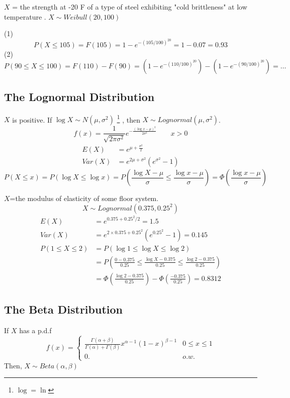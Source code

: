\begin{exmp}
$X$ = the strength at  -20 F of a type of steel exhibiting "cold brittleness" at low temperature . $X \sim Weibull(20,100)$

(1) 
\[P(X \leq 105)=F(105)=1-e^{-(105/100)^{20}}=1-0.07=\boxed{0.93}\]
(2)
\[P(90 \leq X \leq 100)=F(110)-F(90)=\left(1-e^{-(110/100)^{20}}\right)-\left(1-e^{-(90/100)^{20}}\right)=\boxed{\dots}\] 
\end{exmp}

\subsection{The Lognormal Distribution}
$X$ is positive. If $\log{X} \sim N(\mu,\sigma^2)$ \footnote{$\log=\ln$} , then $X \sim Lognormal(\mu,\sigma^2)$.
\[f(x)=\frac{1}{\sqrt{2 \pi \sigma^2}} e^{-\frac{(\log{x}-\mu)^2}{2 \sigma^2}}   \qquad  x>0\]
\begin{align*}
E(X)&=e^{\mu +\frac{\sigma^2}{2}} \\
Var(X)&=e^{2\mu +\sigma^2} (e^{\sigma^2}-1)
\end{align*}
\[P(X \leq x)=P(\log{X}\leq \log{x})= P \left(\frac{\log{X}-\mu}{\sigma} \leq \frac{\log{x}-\mu}{\sigma} \right)  =\Phi \left(\frac{\log{x}-\mu}{\sigma} \right)\]

\begin{exmp}
$X$=the modulus of elasticity of some floor system.
\[X \sim Lognormal(0.375,0.25^2)\]
\begin{align*}
E(X)&=e^{0.375+0.25^{2}/2}=1.5\\
Var(X)&= e^{2\times0.375+0.25^{2}}\left(e^{0.25^{2}}-1\right)=0.145\\
P(1 \leq X \leq 2)&=P(\log{1} \leq \log{X}\leq \log{2})\\
&= P \left(\frac{0-0.375}{0.25} \leq \frac{\log{X}-0.375}{0.25} \leq \frac{\log{2}-0.375}{0.25} \right) \\
& =\Phi \left(\frac{\log{2}-0.375}{0.25} \right)-\Phi \left(\frac{-0.375}{0.25} \right)=\boxed{0.8312}
\end{align*}


\end{exmp}

\subsection{The Beta Distribution}
If $X$ has a p.d.f 
\[f(x)=\begin{cases}
\frac{\Gamma(\alpha+\beta)}{\Gamma(\alpha)+\Gamma(\beta)}x^{\alpha-1}(1-x)^{\beta-1}  & 0 \leq x \leq 1 \\
0. & o.w.
\end{cases}\]
Then, $X \sim Beta(\alpha,\beta)$

